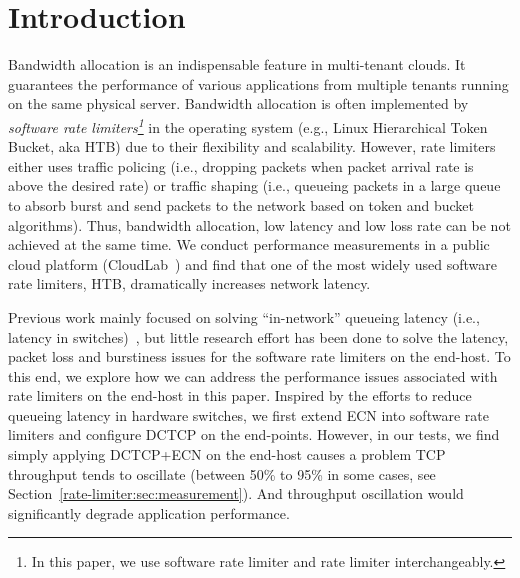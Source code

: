 \section{Introduction}
\label{sec:introduction}

Bandwidth allocation is an indispensable feature in multi-tenant clouds. 
It guarantees the performance of various applications from multiple tenants running on the same physical server. 
Bandwidth allocation is often implemented by \textit{software rate limiters\footnote{In this paper,
we use software rate limiter and rate limiter interchangeably.}} 
in the operating system (e.g., Linux Hierarchical Token Bucket, aka HTB) due to their flexibility and scalability.
However, rate limiters either uses traffic policing (i.e., dropping packets when
packet arrival rate is above the desired rate) or traffic shaping (i.e., queueing packets in a large
queue to absorb burst and send packets to the network based on token and bucket algorithms).
Thus, bandwidth allocation, low latency and low loss rate can be not achieved at the same time. 
We conduct performance measurements in a public cloud platform (CloudLab~\cite{cloudlab}) and 
find that one of the most widely used software rate limiters, HTB, dramatically increases network latency.

Previous work mainly focused on solving ``in-network'' queueing latency (i.e., latency in 
switches)~\cite{alizadeh2010data,he2016ac,mittal2015timely}, but little research effort has been
done to solve the latency, packet loss and burstiness issues for the software rate limiters on the end-host.
To this end, we explore how we can address the performance issues associated with rate limiters on the end-host in this paper.
Inspired by the efforts to reduce queueing latency in hardware switches, 
we first extend ECN into software rate limiters and configure DCTCP on the end-points. 
However, in our tests, we find simply applying DCTCP+ECN on the end-host causes a problem \textemdash\xspace 
TCP throughput tends to oscillate (between 50\% to 95\% in some cases, see Section~\ref{rate-limiter:sec:measurement}). 
And throughput oscillation would significantly degrade application performance. 

